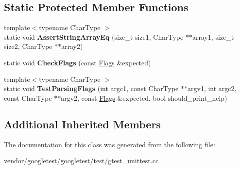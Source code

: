 \subsection*{Static Protected Member Functions}
\begin{DoxyCompactItemize}
\item 
\mbox{\label{classtesting_1_1_init_google_test_test_af32acd91b1185c6868072009dce55a7b}} 
{\footnotesize template$<$typename Char\+Type $>$ }\\static void {\bfseries Assert\+String\+Array\+Eq} (size\+\_\+t size1, Char\+Type $\ast$$\ast$array1, size\+\_\+t size2, Char\+Type $\ast$$\ast$array2)
\item 
\mbox{\label{classtesting_1_1_init_google_test_test_aac37d5d592202bf6614b02fe0b4da9d2}} 
static void {\bfseries Check\+Flags} (const \mbox{\hyperlink{structtesting_1_1_flags}{Flags}} \&expected)
\item 
\mbox{\label{classtesting_1_1_init_google_test_test_add290338cf429308d0ab275ae4c46e69}} 
{\footnotesize template$<$typename Char\+Type $>$ }\\static void {\bfseries Test\+Parsing\+Flags} (int argc1, const Char\+Type $\ast$$\ast$argv1, int argc2, const Char\+Type $\ast$$\ast$argv2, const \mbox{\hyperlink{structtesting_1_1_flags}{Flags}} \&expected, bool should\+\_\+print\+\_\+help)
\end{DoxyCompactItemize}
\subsection*{Additional Inherited Members}


The documentation for this class was generated from the following file\+:\begin{DoxyCompactItemize}
\item 
vendor/googletest/googletest/test/gtest\+\_\+unittest.\+cc\end{DoxyCompactItemize}

